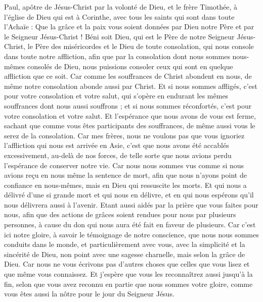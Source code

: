 \begin{multicols}{2}
\VerseOne{}Paul, apôtre de Jésus-Christ par la volonté de Dieu, et le frère Timothée, à l'église de Dieu qui est à Corinthe, avec tous les saints qui sont dans toute l'Achaïe :
Que la grâce et la paix vous soient données par Dieu notre Père et par le Seigneur Jésus-Christ !
Béni soit Dieu, qui est le Père de notre Seigneur Jésus-Christ, le Père des miséricordes et le Dieu de toute consolation,
qui nous console dans toute notre affliction, afin que par la consolation dont nous sommes nous-mêmes consolés de Dieu, nous puissions consoler ceux qui sont en quelque affliction que ce soit.
Car comme les souffrances de Christ abondent en nous, de même notre consolation abonde aussi par Christ.
Et si nous sommes affligés, c'est pour votre consolation et votre salut, qui s'opère en endurant les mêmes souffrances dont nous aussi souffrons ; et si nous sommes réconfortés, c'est pour votre consolation et votre salut.
Et l'espérance que nous avons de vous est ferme, sachant que comme vous êtes participants des souffrances, de même aussi vous le serez de la consolation.
Car mes frères, nous ne voulons pas que vous ignoriez l'affliction qui nous est arrivée en Asie, c'est que nous avons été accablés excessivement, au-delà de nos forces, de telle sorte que nous avions perdu l'espérance de conserver notre vie.
Car nous nous sommes vus comme si nous avions reçu en nous même la sentence de mort, afin que nous n'ayons point de confiance en nous-mêmes, mais en Dieu qui ressuscite les morts.
Et qui nous a délivré d'une si grande mort et qui nous en délivre, et en qui nous espérons qu'il nous délivrera aussi à l'avenir.
Etant aussi aidés par la prière que vous faites pour nous, afin que des actions de grâces soient rendues pour nous par plusieurs personnes, à cause du don qui nous aura été fait en faveur de plusieurs.
Car c'est ici notre gloire, à savoir le témoignage de notre conscience, que nous nous sommes conduits dans le monde, et particulièrement avec vous, avec la simplicité et la sincérité de Dieu, non point avec une sagesse charnelle, mais selon la grâce de Dieu.
Car nous ne vous écrivons pas d'autres choses que celles que vous lisez et que même vous connaissez. Et j'espère que vous les reconnaîtrez aussi jusqu'à la fin,
selon que vous avez reconnu en partie que nous sommes votre gloire, comme vous êtes aussi la nôtre pour le jour du Seigneur Jésus.

\end{multicols}
